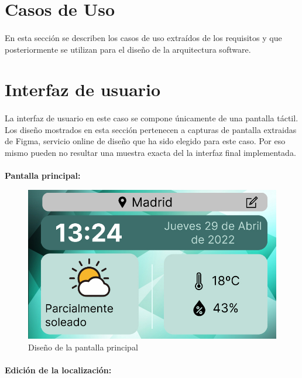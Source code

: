 \section{Casos de Uso}

\paragraph{}En esta sección se describen los casos de uso extraídos de los requisitos
y que posteriormente se utilizan para el diseño de la arquitectura software.

\section{Interfaz de usuario}

\paragraph{}La interfaz de usuario en este caso se compone únicamente de una pantalla
táctil. Los diseño mostrados en esta sección pertenecen a capturas de pantalla extraidas
de Figma, servicio online de diseño que ha sido elegido para este caso. Por eso mismo
pueden no resultar una muestra exacta del la interfaz final implementada.

\paragraph{}\textbf{Pantalla principal:}

\begin{figure}[H]
	\centering
	\includegraphics[width=0.75\linewidth]{imgs/figma-main}
	\caption[Diseño de la pantalla principal]{Diseño de la pantalla principal}
	\label{fig:design_main_screen}
\end{figure}

\paragraph{}\textbf{Edición de la localización:}

